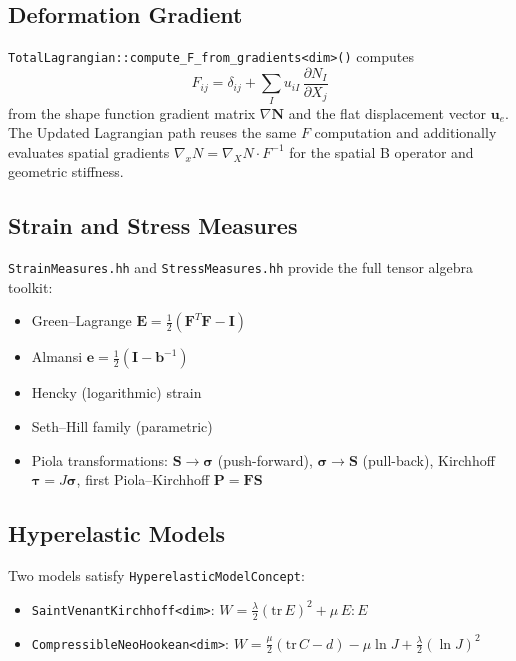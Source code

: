 \subsection{Deformation Gradient}

\texttt{TotalLagrangian::compute\_F\_from\_gradients<dim>()} computes
\[
  F_{ij} = \delta_{ij} + \sum_I u_{iI}\,\frac{\partial N_I}{\partial X_j}
\]
from the shape function gradient matrix $\nabla\mathbf{N}$ and the flat
displacement vector $\mathbf{u}_e$.  The Updated Lagrangian path reuses
the same $F$ computation and additionally evaluates spatial gradients
$\nabla_x N = \nabla_X N \cdot F^{-1}$ for the spatial B operator and
geometric stiffness.

\subsection{Strain and Stress Measures}

\texttt{StrainMeasures.hh} and \texttt{StressMeasures.hh} provide the
full tensor algebra toolkit:

\begin{itemize}
  \item Green--Lagrange
        $\mathbf{E} = \tfrac{1}{2}(\mathbf{F}^T\mathbf{F} - \mathbf{I})$
  \item Almansi
        $\mathbf{e} = \tfrac{1}{2}(\mathbf{I} - \mathbf{b}^{-1})$
  \item Hencky (logarithmic) strain
  \item Seth--Hill family (parametric)
  \item Piola transformations:
        $\mathbf{S} \to \boldsymbol{\sigma}$ (push-forward),
        $\boldsymbol{\sigma} \to \mathbf{S}$ (pull-back),
        Kirchhoff $\boldsymbol{\tau} = J\boldsymbol{\sigma}$,
        first Piola--Kirchhoff $\mathbf{P} = \mathbf{F}\mathbf{S}$
\end{itemize}

\subsection{Hyperelastic Models}

Two models satisfy \texttt{HyperelasticModelConcept}:

\begin{itemize}
  \item \texttt{SaintVenantKirchhoff<dim>}: $W = \tfrac{\lambda}{2}(\mathrm{tr}\,E)^2 + \mu\,E : E$
  \item \texttt{CompressibleNeoHookean<dim>}: $W = \tfrac{\mu}{2}(\mathrm{tr}\,C - d) - \mu\ln J + \tfrac{\lambda}{2}(\ln J)^2$
\end{itemize}

